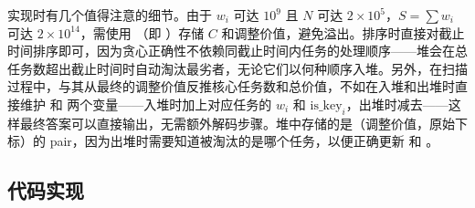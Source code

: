 实现时有几个值得注意的细节。由于 $w_i$ 可达 $10^9$ 且 $N$ 可达 $2 \times 10^5$，$S = \sum w_i$ 可达 $2 \times 10^{14}$，需使用 （即 ）存储 $C$ 和调整价值，避免溢出。排序时直接对截止时间排序即可，因为贪心正确性不依赖同截止时间内任务的处理顺序——堆会在总任务数超出截止时间时自动淘汰最劣者，无论它们以何种顺序入堆。另外，在扫描过程中，与其从最终的调整价值反推核心任务数和总价值，不如在入堆和出堆时直接维护  和  两个变量——入堆时加上对应任务的 $w_i$ 和 $\text{is\_key}_i$，出堆时减去——这样最终答案可以直接输出，无需额外解码步骤。堆中存储的是（调整价值，原始下标）的 pair，因为出堆时需要知道被淘汰的是哪个任务，以便正确更新  和 。

\subsection{代码实现}
\inputminted{c++}{../src/p07_task_scheduler.cpp}
